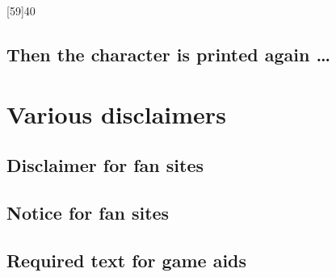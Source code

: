 \documentclass{article}
\begin{document}
\begin{character}
  [59]{40}
\end{character}

\subsection{Then the character is printed again \ldots{}}
\label{sec:then-char-prepr}



\section{Various disclaimers}
\label{sec:various-disclaimers}

\subsection{Disclaimer for fan sites}
\label{sec:disclaimer-fan-sites}

\SJGamesOnlinePolicyDisclaimer

\subsection{Notice for fan sites}
\label{sec:disclaimer-fan-sites}

\SJGamesOnlinePolicyNotice

\subsection{Required text for game aids}
\label{sec:disclaimer-fan-sites}

\end{document}
